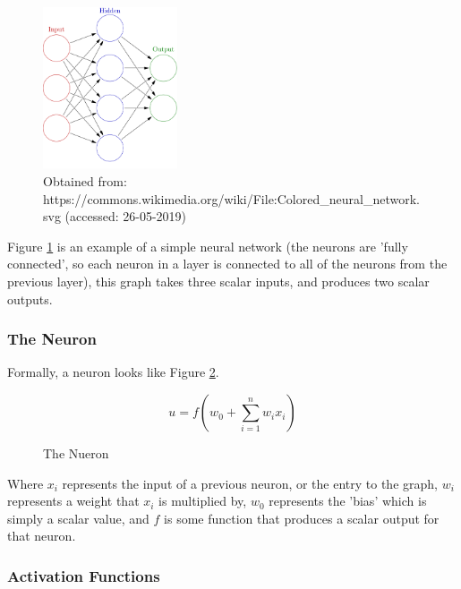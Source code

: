     \begin{figure}[h]
        \centering
        \includegraphics[width=150px]{../img/1000px-Colored_neural_network.png}
        \caption{Obtained from: https://commons.wikimedia.org/wiki/File:Colored\_neural\_network.svg (accessed: 26-05-2019)}
        \label{fig:fcneuralnet}
    \end{figure}

    Figure \ref{fig:fcneuralnet} is an example of a simple neural network (the neurons are 'fully connected', so each neuron in a layer is connected to all of the neurons from the previous layer), this graph takes three scalar inputs, and produces two scalar outputs.

        \subsubsection{The Neuron}
        Formally, a neuron looks like Figure \ref{fig:theneuron}.
        \begin{figure}[h]
        \[
            u=f(w_0+\sum_{i=1}^nw_ix_i)
        \]
        \caption{The Nueron}
        \label{fig:theneuron}
        \end{figure}
        Where $x_i$ represents the input of a previous neuron, or the entry to the graph, $w_i$ represents a weight that $x_i$ is multiplied by, $w_0$ represents the 'bias' which is simply a scalar value, and $f$ is some function that produces a scalar output for that neuron.
        
        \subsubsection{Activation Functions}


